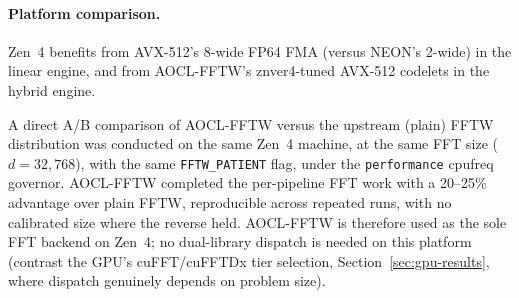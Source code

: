 \documentclass[11pt]{article}
\begin{document}
\begin{table}[t]
\centering
\caption{Parallel execution time (ms), $Q = 256$, uniform stacks.
  M3 Pro: 12 threads (6P+6E). Zen 4: 16 threads.
  Best engine per cell: L = linear, H = hybrid, T = tree.}
\label{tab:parallel}
\end{table}

\paragraph{Platform comparison.}
Zen~4 benefits from AVX-512's 8-wide FP64 FMA (versus NEON's 2-wide) in the
linear engine, and from AOCL-FFTW's znver4-tuned AVX-512 codelets in the
hybrid engine.

A direct A/B comparison of AOCL-FFTW versus the upstream (plain) FFTW
distribution was conducted on the same Zen~4 machine, at the same FFT size
($d = 32{,}768$), with the same \texttt{FFTW\_PATIENT} flag, under the
\texttt{performance} cpufreq governor. AOCL-FFTW completed the per-pipeline
FFT work with a 20--25\% advantage over plain FFTW, reproducible across
repeated runs, with no calibrated size where the reverse held. AOCL-FFTW is therefore used as the sole FFT
backend on Zen~4; no dual-library dispatch is needed on this platform
(contrast the GPU's cuFFT/cuFFTDx tier selection, Section~\ref{sec:gpu-results},
where dispatch genuinely depends on problem size).
\end{document}
